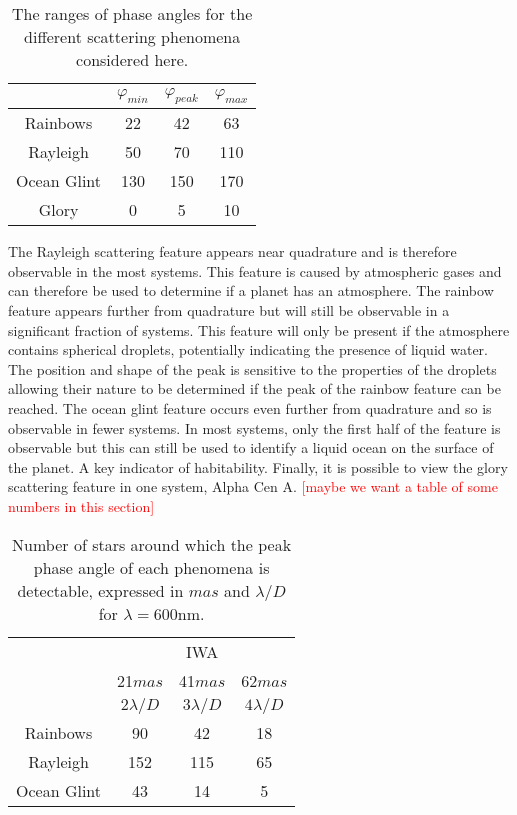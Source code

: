\documentclass[
    usenatbib,
]{mnras}
\newcommand{\todo}[1]{\textcolor{red}{[#1]}}
\begin{document}
\begin{table}
    \centering
    \caption{
        The ranges of phase angles for the different scattering phenomena considered here.
    }
    \label{tab:phase_ranges}
    \begin{tabular}{ c c c c } 
    \toprule
     & $\varphi_{min}$ & $\varphi_{peak}$ & $\varphi_{max}$ \\
    \midrule
    \midrule
    Rainbows & 22 & 42 & 63 \\
    Rayleigh & 50 & 70 & 110 \\
    Ocean Glint & 130 & 150 & 170 \\
    Glory & 0 & 5 & 10 \\
    \bottomrule
    \end{tabular}
\end{table}




The Rayleigh scattering feature appears near quadrature and is therefore observable in the most systems.
%
This feature is caused by atmospheric gases and can therefore be used to determine if a planet has an atmosphere.
%
The rainbow feature appears further from quadrature but will still be observable in a significant fraction of systems.
%
This feature will only be present if the atmosphere contains spherical droplets, potentially indicating the presence of liquid water.
%
The position and shape of the peak is sensitive to the properties of the droplets allowing their nature to be determined if the peak of the rainbow feature can be reached.
%
The ocean glint feature occurs even further from quadrature and so is observable in fewer systems. In most systems, only the first half of the feature is observable but this can still be used to identify a liquid ocean on the surface of the planet.
%
A key indicator of habitability. Finally, it is possible to view the glory scattering feature in one system, Alpha Cen A.
%
\todo{maybe we want a table of some numbers in this section}

\begin{table}
    \centering
    \caption{
        Number of stars around which the peak phase angle of each phenomena is detectable, expressed in $mas$ and $\lambda/D$ for $\lambda=600$nm. 
    }
    \label{tab:nstars_detect}
    \begin{tabular}{ c c c c } 
    \toprule
      & \multicolumn{3}{c}{IWA}
    \\
     & 21$mas$ & 41$mas$ & 62$mas$
    \\
     & $2\lambda/D$ & $3\lambda/D$ & $4\lambda/D$ 
    \\
    \midrule
    \midrule
    Rainbows & 90 & 42 & 18 \\
    Rayleigh & 152 & 115 & 65 \\
    Ocean Glint & 43 & 14 & 5 \\
    \bottomrule
    \end{tabular}
\end{table}
\end{document}
